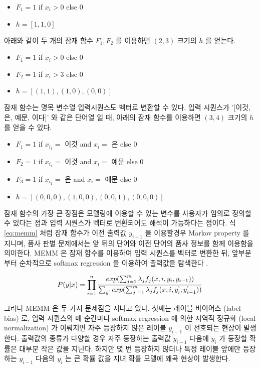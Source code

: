 \documentclass[oneside, ko,phd]{snuthesis_utf8_kor}
\begin{document}
\begin{itemize}
  \item $F_1 = 1$ if $x_i > 0$ else $0$
  \item $h = [1, 1, 0]$
\end{itemize}

아래와 같이 두 개의 잠재 함수 $F_1, F_2$ 를 이용하면 $(2, 3)$ 크기의 $h$ 를 얻는다.

\begin{itemize}
  \item $F_1 = 1$ if $x_i > 0$ else $0$
  \item $F_2 = 1$ if $x_i > 3$ else $0$
  \item $h = [(1, 1), (1, 0), (0, 0)]$
\end{itemize}

잠재 함수는 명목 변수열 입력시퀀스도 벡터로 변환할 수 있다.
입력 시퀀스가 '[이것, 은, 예문, 이다]' 와 같은 단어열 일 때, 아래의 잠재 함수를 이용하면 $(3, 4)$ 크기의 $h$ 를 얻을 수 있다.

\begin{itemize}
  \item $F_1 = 1$ if $x_{i_1} =$ 이것 and $x_{i} =$ 은 else $0$
  \item $F_2 = 1$ if $x_{i_1} =$ 이것 and $x_{i} =$ 예문 else $0$
  \item $F_3 = 1$ if $x_{i_1} =$ 은 and $x_{i} =$ 예문 else $0$
  \item $h = [(0, 0, 0), (1, 0, 0), (0, 0, 1), (0, 0, 0)]$
\end{itemize}

잠재 함수의 가장 큰 장점은 모델링에 이용할 수 있는 변수를 사용자가 임의로 정의할 수 있다는 점과 입력 시퀀스가 벡터로 변환되어도 해석이 가능하다는 점이다.
식 \ref{eq:memm} 처럼 잠재 함수가 이전 출력값 $y_{i-1}$ 을 이용할경우 Markov property 를 지니며, 품사 판별 문제에서는 앞 뒤의 단어와 이전 단어의 품사 정보를 함께 이용함을 의미한다.
MEMM 은 잠재 함수를 이용하여 입력 시퀀스를 벡터로 변환한 뒤, 앞부분부터 순차적으로 softmax regression 을 이용하여 출력값을 탐색한다 \cite{mccallum2000maximum}.

\begin{equation}
  \label{eq:memm}
  P(y \vert x) = \prod_{i=1}^{n} \frac{exp(\sum_{j=1}^{m} \lambda_j f_j (x, i, y_i, y_{i-1}))}{ \sum_{y^{`}} exp(\sum_{j^{`}=1}^{m} \lambda_j f_j (x, i, y_i^{`}, y_{i-1}^{`})) }
\end{equation}

그러나 MEMM 은 두 가지 문제점을 지니고 있다.
첫째는 레이블 바이어스 (label bias) 로, 입력 시퀀스의 매 순간마다 softmax regression 에 의한 지역적 정규화 (local normalization) 가 이뤄지면 자주 등장하지 않은 레이블 $y_{i-1}$ 이 선호되는 현상이 발생한다\cite{lafferty2001conditional, kudo2004applying, andor2016globally}.
출력값의 종류가 다양할 경우 자주 등장하는 출력값 $y_{i-1}$ 다음에 $y_i$ 가 등장할 확률은 대부분 작은 값을 지닌다.
하지만 몇 번 등장하지 않더나 특정 레이블 앞에만 등장하는 $y_{i-1}$ 다음의 $y_i$ 는 큰 확률 값을 지녀 확률 모델에 왜곡 현상이 발생한다.
\end{document}
